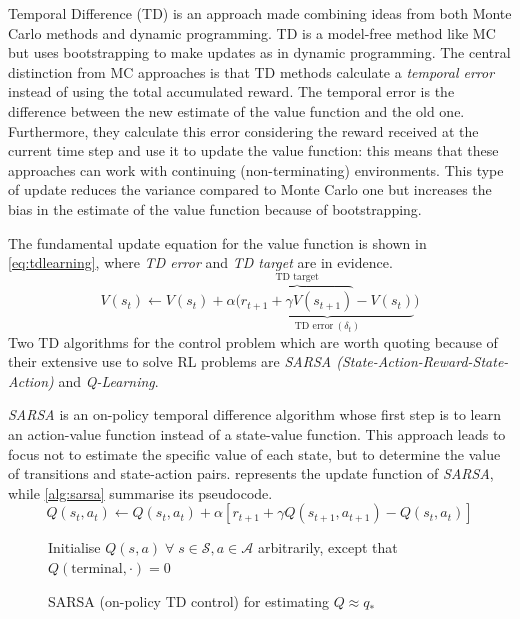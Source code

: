 Temporal Difference (TD) is an approach made combining ideas from both Monte Carlo methods and dynamic programming. TD is a model-free method like MC but uses bootstrapping to make updates as in dynamic programming. The central distinction from MC approaches is that TD methods calculate a \textit{temporal error} instead of using the total accumulated reward. The temporal error is the difference between the new estimate of the value function and the old one. Furthermore, they calculate this error considering the reward received at the current time step and use it to update the value function: this means that these approaches can work with continuing (non-terminating) environments.
This type of update reduces the variance compared to Monte Carlo one but increases the bias in the estimate of the value function because of bootstrapping.

The fundamental update equation for the value function is shown in \vref{eq:tdlearning}, where \textit{TD error} and \textit{TD target} are in evidence.
\begin{equation}\label{eq:tdlearning}
	V(s_t) \leftarrow V(s_t) + \alpha \big(\underbrace{\overbrace{r_{t+1} + \gamma V(s_{t+1})}^{\text{TD target}}- V(s_t)}_{\text{TD error} \ (\delta_t)}\big)
\end{equation}
Two TD algorithms for the control problem which are worth quoting because of their extensive use to solve RL problems are \textit{SARSA (State-Action-Reward-State-Action)} and \textit{Q-Learning}.

\textit{SARSA} is an on-policy temporal difference algorithm whose first step is to learn an action-value function instead of a state-value function. This approach leads to focus not to estimate the specific value of each state, but to determine the value of transitions and state-action pairs.  represents the update function of \textit{SARSA}, while \vref{alg:sarsa} summarise its pseudocode.
\begin{equation}\label{eq:sarsa}
	Q(s_t, a_t) \leftarrow Q(s_t, a_t) + \alpha [r_{t+1} + \gamma Q(s_{t+1}, a_{t+1}) - Q(s_t, a_t)]
\end{equation}
\begin{figure}

	\begin{algorithm}[H]
		\SetAlgoLined
		\DontPrintSemicolon
		\LinesNumbered
		\KwIn{step size $\alpha \in (0,1]$, small $\epsilon > 0$\;}
		Initialise $Q(s,a) \; \forall\; s \in \mathcal{S}, a \in \mathcal{A}$ arbitrarily, except that $Q(\text{terminal}, \cdot) = 0$\;
		\caption{SARSA (on-policy TD control) for estimating $Q \approx q_*$}
		\label{alg:sarsa}
	\end{algorithm}
\end{figure}


